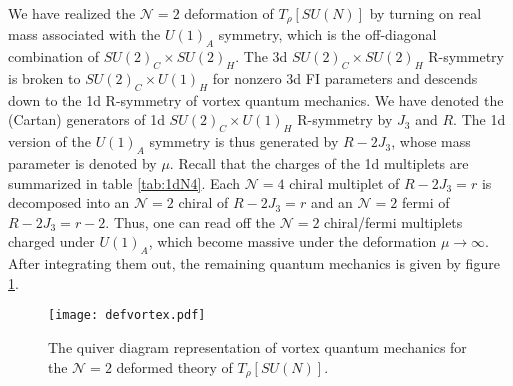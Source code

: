 \documentclass[a4paper,11pt]{article}
\begin{document}
We have realized the $\mathcal N = 2$ deformation of $T_\rho [SU(N)]$ by turning on real mass associated with the $U(1)_A$ symmetry, which is the off-diagonal combination of $SU(2)_C \times SU(2)_H$. The 3d $SU(2)_C \times SU(2)_H$ R-symmetry is broken to $SU(2)_C \times U(1)_H$ for nonzero 3d FI parameters and descends down to the 1d R-symmetry of vortex quantum mechanics. We have denoted the (Cartan) generators of 1d $SU(2)_C \times U(1)_H$ R-symmetry by $J_3$ and $R$. The 1d version of the $U(1)_A$ symmetry is thus generated by $R-2 J_3$, whose mass parameter is denoted by $\mu$. Recall that the charges of the 1d multiplets are summarized in table \ref{tab:1dN4}. Each $\mathcal N = 4$ chiral multiplet of $R-2 J_3 = r$ is decomposed into an $\mathcal N = 2$ chiral of $R-2 J_3 = r$ and an $\mathcal N = 2$ fermi of $R-2 J_3 = r-2$. Thus, one can read off the $\mathcal N = 2$ chiral/fermi multiplets charged under $U(1)_A$, which become massive under the deformation $\mu \rightarrow \infty$. After integrating them out, the remaining quantum mechanics is given by figure \ref{fig:def vortex}.
%
\begin{figure}[tbp]
\centering %
\texttt{[image: defvortex.pdf]}
\caption{\label{fig:def vortex} The quiver diagram representation of vortex quantum mechanics for the $\mathcal N = 2$ deformed theory of $T_\rho [SU(N)]$. }
\end{figure}
%
\end{document}
